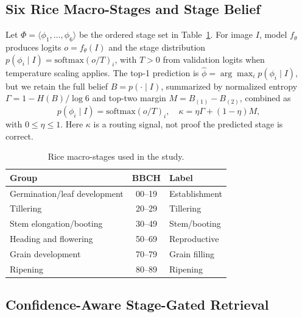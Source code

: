 \documentclass[conference,a4paper]{IEEEtran}
\begin{document}
\subsection{Six Rice Macro-Stages and Stage Belief}

Let $\Phi = \langle \phi_1,\dots,\phi_6 \rangle$ be the ordered stage set in Table~\ref{tab:stages}. For image $I$, model $f_\theta$ produces logits $o = f_\theta(I)$ and the stage distribution $p(\phi_i \mid I) = \mathrm{softmax}(o/T)_i$, with $T>0$ from validation logits when temperature scaling applies. The top-1 prediction is $\hat{\phi} = \arg\max_i p(\phi_i \mid I)$, but we retain the full belief $B = p(\cdot \mid I)$, summarized by normalized entropy $\Gamma = 1 - H(B)/\log 6$ and top-two margin $M = B_{(1)} - B_{(2)}$, combined as
\begin{equation}
p(\phi_i \mid I) = \mathrm{softmax}(o/T)_i, \quad
\kappa = \eta \Gamma + (1-\eta) M,
\label{eq:softmax}
\end{equation}
with $0 \le \eta \le 1$. Here $\kappa$ is a routing signal, not proof the predicted stage is correct.

\begin{table}[t]
\centering
\caption{Rice macro-stages used in the study.}
\label{tab:stages}
\footnotesize
\begin{tabular}{lcl}
\toprule
\textbf{Group} & \textbf{BBCH} & \textbf{Label} \\
\midrule
Germination/leaf development & 00--19 & Establishment \\
Tillering & 20--29 & Tillering \\
Stem elongation/booting & 30--49 & Stem/booting \\
Heading and flowering & 50--69 & Reproductive \\
Grain development & 70--79 & Grain filling \\
Ripening & 80--89 & Ripening \\
\bottomrule
\end{tabular}
\end{table}

\subsection{Confidence-Aware Stage-Gated Retrieval}
\end{document}
